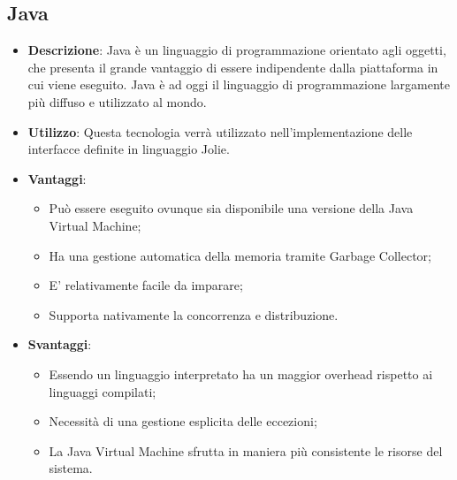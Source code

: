 \subsection{Java}
\begin{itemize}
	\item \textbf{Descrizione}: Java è un linguaggio di programmazione orientato agli oggetti, che presenta il grande vantaggio di essere indipendente dalla piattaforma in cui viene eseguito. Java è ad oggi il linguaggio di programmazione largamente più diffuso e utilizzato al mondo.
	\item \textbf{Utilizzo}: Questa tecnologia verrà utilizzato nell'implementazione delle interfacce definite in linguaggio Jolie.
	\item \textbf{Vantaggi}:
	\begin{itemize}
		\item Può essere eseguito ovunque sia disponibile una versione della Java Virtual Machine;
		\item Ha una gestione automatica della memoria tramite Garbage Collector;
		\item E' relativamente facile da imparare;
		\item Supporta nativamente la concorrenza e distribuzione.
	\end{itemize}
	\item \textbf{Svantaggi}:
	\begin{itemize}
		\item Essendo un linguaggio interpretato ha un maggior overhead rispetto ai linguaggi compilati;
		\item Necessità di una gestione esplicita delle eccezioni;
		\item La Java Virtual Machine sfrutta in maniera più consistente le risorse del sistema.
	\end{itemize}
\end{itemize}

